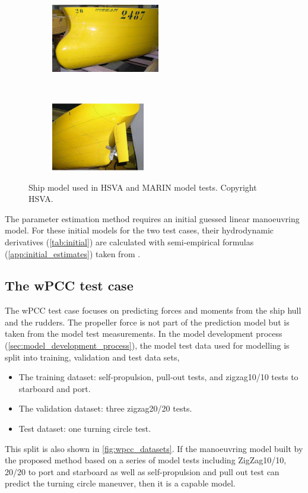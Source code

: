 \begin{figure}[!htb]
    \centering
    \begin{subfigure}[b]{0.45\textwidth}
    \centering
    \includegraphics[height=3cm]{kappa/images/kvlcc2_front.png}
    \end{subfigure}
    ~
     \begin{subfigure}[b]{0.45\textwidth}
     \centering
     \includegraphics[height=3cm]{kappa/images/kvlcc2_aft.png}
     \end{subfigure}
    \caption{Ship model used in HSVA and MARIN model tests. Copyright HSVA.}
    \label{fig:kvlcc2_hsva}
\end{figure}





\noindent The parameter estimation method requires an initial guessed linear manoeuvring model. For these initial models for the two test cases, their hydrodynamic derivatives (\autoref{tab:initial}) are calculated with semi-empirical formulas (\autoref{app:initial_estimates}) taken from \cite{brix_manoeuvring_1993}. 



\subsection{The wPCC test case}
\label{\detokenize{05.01_case_studies:the-wpcc-test-scenarios}}

The wPCC test case focuses on predicting forces and moments from the ship hull and the rudders. The propeller force is not part of the prediction model but is taken from the model test measurements.
In the model development process (\autoref{sec:model_development_process}), the model test data used for modelling is split into training, validation and test data sets, 
\begin{itemize}
    \item The training dataset: self-propulsion, pull-out tests, and zigzag10/10 tests to starboard and port.
    \item The validation dataset: three zigzag20/20 tests.
    \item Test dataset: one turning circle test.
\end{itemize}
\noindent This split is also shown in \autoref{fig:wpcc_datasets}. If the manoeuvring model built by the proposed method based on a series of model tests including ZigZag10/10, 20/20 to port and starboard as well as self-propulsion and pull out test \cite{imo_standards_2002} can predict the turning circle maneuver, then it is a capable model.

